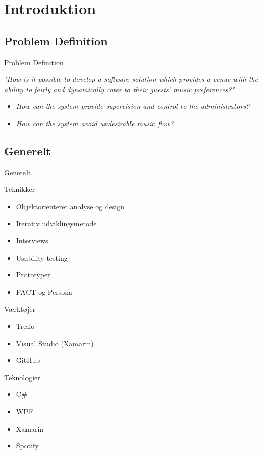 \section{Introduktion}

\subsection{Problem Definition}
\begin{frame}{Problem Definition}
	\begin{center}
		\textit{"How is it possible to develop a software solution which provides a venue with the ability to fairly and dynamically cater to their guests' music preferences?"}
	\end{center}
	\begin{itemize}
		\item \textit{How can the system provide supervision and control to the administrators?}
		\item \textit{How can the system avoid undesirable music flow?}
	\end{itemize}
\end{frame}

\subsection{Generelt}
\begin{frame}{Generelt}
	\begin{multicols}{2}
		Teknikker
		\begin{itemize}
			\item Objektorienteret analyse og design
			\item Iterativ udviklingsmetode
			\item Interviews
			\item Usability testing
			\item Prototyper
			\item PACT og Persona\newline
		\end{itemize}
		
		Værktøjer
		\begin{itemize}
			\item Trello
			\item Visual Studio (Xamarin)
			\item GitHub
		\end{itemize}
		
		\columnbreak
		
		Teknologier
		\begin{itemize}
			\item C\#
			\item WPF
			\item Xamarin
			\item Spotify
		\end{itemize}
	\end{multicols}
\end{frame}

